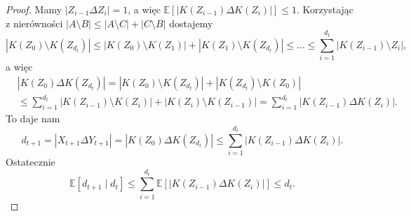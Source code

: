 \begin{proof}
    Mamy $\left|Z_{i-1}\Delta Z_i\right|=1$, a więc $\mathbb{E}\left[ \left|K\left( Z_{i-1} \right) \Delta K\left( Z_i \right) \right| \right] \le 1$. Korzystając z nierówności $\left|A\setminus B \right|\le \left|A\setminus C \right|+\left|C\setminus B\right|$ dostajemy
    $$ \left|K\left( Z_0 \right) \setminus K\left( Z_{d_t} \right) \right|\le \left|K\left( Z_0 \right) \setminus K\left( Z_1 \right) \right|+ \left|K\left( Z_1 \right) \setminus K\left( Z_{d_t} \right) \right|\le \ldots\le \sum_{i=1}^{d_t} \left|K\left( Z_{i-1} \right) \setminus Z_i\right|, $$ 
    a więc
    \begin{align*}
        &\left|K\left( Z_0 \right) \Delta K\left( Z_{d_t} \right) \right| = \left|K\left( Z_0 \right) \setminus  K\left( Z_{d_t} \right) \right|+ \left|K\left( Z_{d_t} \right) \setminus K\left( Z_0 \right) \right| \\ 
        &\le \sum_{i=1}^{d_t} \left|K\left( Z_{i-1} \right) \setminus K\left( Z_i \right) \right|+ \left|K\left( Z_i \right) \setminus K\left( Z_{i-1} \right) \right| = \sum_{i=1}^{d_t} \left|K\left( Z_{i-1}\right) \Delta K\left( Z_i \right)  \right| .
    \end{align*}
    To daje nam
    $$ d_{t+1} = \left|X_{t+1}\Delta Y_{t+1}\right| = \left|K\left( Z_0 \right) \Delta K\left( Z_{d_t} \right) \right|\le \sum_{i=1}^{d_t} \left|K\left( Z_{i-1} \right) \Delta K\left( Z_i \right) \right|. $$ 
    Ostatecznie
    $$ \mathbb{E}\left[ d_{t+1} \mid d_t \right] \le \sum_{i=1}^{d_t} \mathbb{E}\left[ \left|K\left( Z_{i-1} \right) \Delta K\left( Z_i \right) \right| \right] \le d_t. $$ 
\end{proof}

